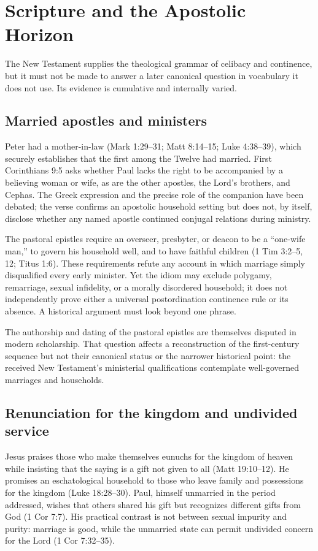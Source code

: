 \section{Scripture and the Apostolic Horizon}

The New Testament supplies the theological grammar of celibacy and continence, but it must not be made to answer a later canonical question in vocabulary it does not use. Its evidence is cumulative and internally varied.

\subsection{Married apostles and ministers}

Peter had a mother-in-law (Mark 1:29--31; Matt 8:14--15; Luke 4:38--39), which securely establishes that the first among the Twelve had married. First Corinthians 9:5 asks whether Paul lacks the right to be accompanied by a believing woman or wife, as are the other apostles, the Lord's brothers, and Cephas. The Greek expression and the precise role of the companion have been debated; the verse confirms an apostolic household setting but does not, by itself, disclose whether any named apostle continued conjugal relations during ministry.

The pastoral epistles require an overseer, presbyter, or deacon to be a ``one-wife man,'' to govern his household well, and to have faithful children (1 Tim 3:2--5, 12; Titus 1:6). These requirements refute any account in which marriage simply disqualified every early minister. Yet the idiom may exclude polygamy, remarriage, sexual infidelity, or a morally disordered household; it does not independently prove either a universal postordination continence rule or its absence. A historical argument must look beyond one phrase.

The authorship and dating of the pastoral epistles are themselves disputed in modern scholarship. That question affects a reconstruction of the first-century sequence but not their canonical status or the narrower historical point: the received New Testament's ministerial qualifications contemplate well-governed marriages and households.

\subsection{Renunciation for the kingdom and undivided service}

Jesus praises those who make themselves eunuchs for the kingdom of heaven while insisting that the saying is a gift not given to all (Matt 19:10--12). He promises an eschatological household to those who leave family and possessions for the kingdom (Luke 18:28--30). Paul, himself unmarried in the period addressed, wishes that others shared his gift but recognizes different gifts from God (1 Cor 7:7). His practical contrast is not between sexual impurity and purity: marriage is good, while the unmarried state can permit undivided concern for the Lord (1 Cor 7:32--35).

